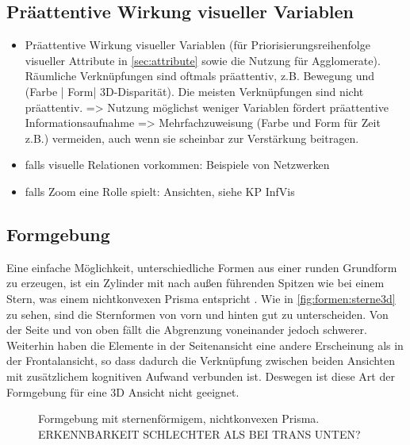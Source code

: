 \subsection{Präattentive Wirkung visueller Variablen}

\begin{itemize}
	\item Präattentive Wirkung visueller Variablen (für Priorisierungsreihenfolge visueller Attribute in \autoref{sec:attribute} sowie die Nutzung für Agglomerate). Räumliche Verknüpfungen sind oftmals präattentiv, z.B. Bewegung und (Farbe | Form| 3D-Disparität). Die meisten Verknüpfungen sind nicht präattentiv. => Nutzung möglichst weniger Variablen fördert präattentive Informationsaufnahme =>  Mehrfachzuweisung (Farbe und Form für Zeit z.B.) vermeiden, auch wenn sie scheinbar zur Verstärkung beitragen.
	\item falls visuelle Relationen vorkommen: Beispiele von Netzwerken
	\item falls Zoom eine Rolle spielt: Ansichten, siehe KP InfVis
\end{itemize}

\subsection{Formgebung}\label{sec:grundlagen:formgebung}
Eine einfache Möglichkeit, unterschiedliche Formen aus einer runden Grundform zu erzeugen, ist ein Zylinder mit nach außen führenden Spitzen wie bei einem Stern, was einem nichtkonvexen Prisma entspricht \cite{UniformPolyhedra}. Wie in \autoref{fig:formen:sterne3d} zu sehen, sind die Sternformen von vorn und hinten gut zu unterscheiden. Von der Seite und von oben fällt die Abgrenzung voneinander jedoch schwerer. Weiterhin haben die Elemente in der Seitenansicht eine andere Erscheinung als in der Frontalansicht, so dass dadurch die Verknüpfung zwischen beiden Ansichten mit zusätzlichem kognitiven Aufwand verbunden ist. Deswegen ist diese Art der Formgebung für eine 3D Ansicht nicht geeignet.

\begin{figure}
	{\caption{Formgebung mit sternenförmigem, nichtkonvexen Prisma. ERKENNBARKEIT SCHLECHTER ALS BEI TRANS UNTEN?}\label{fig:formen:sterne3d}}
\end{figure}

